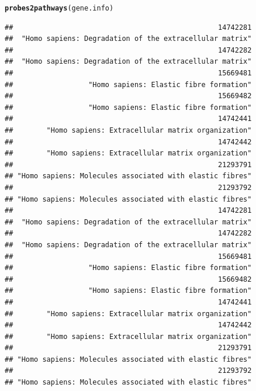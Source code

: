 \documentclass[12pt]{article}\usepackage[]{graphicx}\usepackage[usenames,dvipsnames]{color}
\makeatletter
\newcommand{\hlstd}[1]{\textcolor[rgb]{0.345,0.345,0.345}{#1}}%
\newcommand{\hlkwd}[1]{\textcolor[rgb]{0.737,0.353,0.396}{\textbf{#1}}}%
\newenvironment{kframe}{%
 \def\at@end@of@kframe{}%
 \ifinner\ifhmode%
  \def\at@end@of@kframe{\end{minipage}}%
  \begin{minipage}{\columnwidth}%
 \fi\fi%
 \def\FrameCommand##1{\hskip\@totalleftmargin \hskip-\fboxsep
 \colorbox{shadecolor}{##1}\hskip-\fboxsep
     \hskip-\linewidth \hskip-\@totalleftmargin \hskip\columnwidth}%
 \MakeFramed {\advance\hsize-\width
   \@totalleftmargin\z@ \linewidth\hsize
   \@setminipage}}%
 {\par\unskip\endMakeFramed%
 \at@end@of@kframe}
\newenvironment{knitrout}{}{} %
\makeatother
\begin{document}
\begin{knitrout}
\color{fgcolor}\begin{kframe}
\begin{alltt}
\hlkwd{probes2pathways}\hlstd{(gene.info)}
\end{alltt}
\begin{verbatim}
##                                                 14742281 
##  "Homo sapiens: Degradation of the extracellular matrix" 
##                                                 14742282 
##  "Homo sapiens: Degradation of the extracellular matrix" 
##                                                 15669481 
##                  "Homo sapiens: Elastic fibre formation" 
##                                                 15669482 
##                  "Homo sapiens: Elastic fibre formation" 
##                                                 14742441 
##        "Homo sapiens: Extracellular matrix organization" 
##                                                 14742442 
##        "Homo sapiens: Extracellular matrix organization" 
##                                                 21293791 
## "Homo sapiens: Molecules associated with elastic fibres" 
##                                                 21293792 
## "Homo sapiens: Molecules associated with elastic fibres" 
##                                                 14742281 
##  "Homo sapiens: Degradation of the extracellular matrix" 
##                                                 14742282 
##  "Homo sapiens: Degradation of the extracellular matrix" 
##                                                 15669481 
##                  "Homo sapiens: Elastic fibre formation" 
##                                                 15669482 
##                  "Homo sapiens: Elastic fibre formation" 
##                                                 14742441 
##        "Homo sapiens: Extracellular matrix organization" 
##                                                 14742442 
##        "Homo sapiens: Extracellular matrix organization" 
##                                                 21293791 
## "Homo sapiens: Molecules associated with elastic fibres" 
##                                                 21293792 
## "Homo sapiens: Molecules associated with elastic fibres"
\end{verbatim}
\end{kframe}
\end{knitrout}
\end{document}
